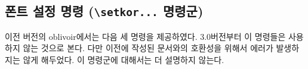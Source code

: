 \documentclass[
	12pt,
	a4paper,
	kosection,
	footnote,
	nobookmarks,
	microtype,
	figtabcapt,
]{oblivoir}
\def\cs#1{\texttt{\textbackslash #1}}
\begin{document}

\subsection{폰트 설정 명령 (\protect\cs{setkor...} 명령군)}

이전 버전의 oblivoir에서는 다음 세 명령을 제공하였다. 3.0버전부터 이 명령들은
사용하지 않는 것으로 본다. 다만 이전에 작성된 문서와의 호환성을 위해서 에러가 발생하지는
않게 해두었다.
이 명령군에 대해서는 더 설명하지 않는다.
\end{document}

